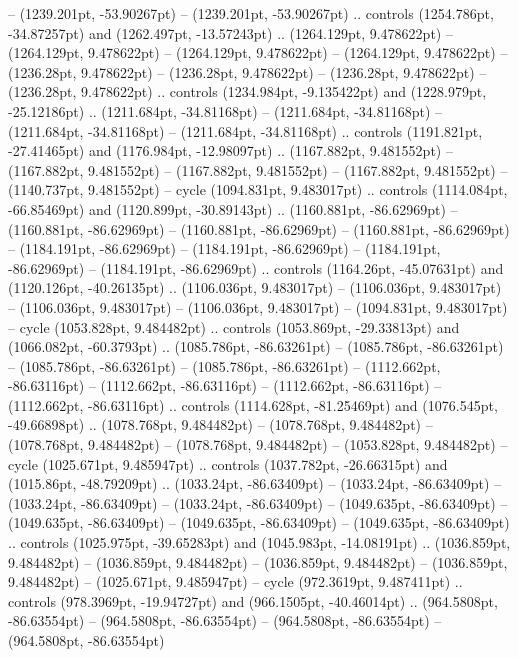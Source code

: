  -- (1239.201pt, -53.90267pt)
 -- (1239.201pt, -53.90267pt) .. controls (1254.786pt, -34.87257pt) and (1262.497pt, -13.57243pt) .. (1264.129pt, 9.478622pt)
 -- (1264.129pt, 9.478622pt)
 -- (1264.129pt, 9.478622pt)
 -- (1264.129pt, 9.478622pt)
 -- (1236.28pt, 9.478622pt)
 -- (1236.28pt, 9.478622pt)
 -- (1236.28pt, 9.478622pt)
 -- (1236.28pt, 9.478622pt) .. controls (1234.984pt, -9.135422pt) and (1228.979pt, -25.12186pt) .. (1211.684pt, -34.81168pt)
 -- (1211.684pt, -34.81168pt)
 -- (1211.684pt, -34.81168pt)
 -- (1211.684pt, -34.81168pt) .. controls (1191.821pt, -27.41465pt) and (1176.984pt, -12.98097pt) .. (1167.882pt, 9.481552pt)
 -- (1167.882pt, 9.481552pt)
 -- (1167.882pt, 9.481552pt)
 -- (1167.882pt, 9.481552pt)
 -- (1140.737pt, 9.481552pt) -- cycle
(1094.831pt, 9.483017pt) .. controls (1114.084pt, -66.85469pt) and (1120.899pt, -30.89143pt) .. (1160.881pt, -86.62969pt)
 -- (1160.881pt, -86.62969pt)
 -- (1160.881pt, -86.62969pt)
 -- (1160.881pt, -86.62969pt)
 -- (1184.191pt, -86.62969pt)
 -- (1184.191pt, -86.62969pt)
 -- (1184.191pt, -86.62969pt)
 -- (1184.191pt, -86.62969pt) .. controls (1164.26pt, -45.07631pt) and (1120.126pt, -40.26135pt) .. (1106.036pt, 9.483017pt)
 -- (1106.036pt, 9.483017pt)
 -- (1106.036pt, 9.483017pt)
 -- (1106.036pt, 9.483017pt)
 -- (1094.831pt, 9.483017pt) -- cycle
(1053.828pt, 9.484482pt) .. controls (1053.869pt, -29.33813pt) and (1066.082pt, -60.3793pt) .. (1085.786pt, -86.63261pt)
 -- (1085.786pt, -86.63261pt)
 -- (1085.786pt, -86.63261pt)
 -- (1085.786pt, -86.63261pt)
 -- (1112.662pt, -86.63116pt)
 -- (1112.662pt, -86.63116pt)
 -- (1112.662pt, -86.63116pt)
 -- (1112.662pt, -86.63116pt) .. controls (1114.628pt, -81.25469pt) and (1076.545pt, -49.66898pt) .. (1078.768pt, 9.484482pt)
 -- (1078.768pt, 9.484482pt)
 -- (1078.768pt, 9.484482pt)
 -- (1078.768pt, 9.484482pt)
 -- (1053.828pt, 9.484482pt) -- cycle
(1025.671pt, 9.485947pt) .. controls (1037.782pt, -26.66315pt) and (1015.86pt, -48.79209pt) .. (1033.24pt, -86.63409pt)
 -- (1033.24pt, -86.63409pt)
 -- (1033.24pt, -86.63409pt)
 -- (1033.24pt, -86.63409pt)
 -- (1049.635pt, -86.63409pt)
 -- (1049.635pt, -86.63409pt)
 -- (1049.635pt, -86.63409pt)
 -- (1049.635pt, -86.63409pt) .. controls (1025.975pt, -39.65283pt) and (1045.983pt, -14.08191pt) .. (1036.859pt, 9.484482pt)
 -- (1036.859pt, 9.484482pt)
 -- (1036.859pt, 9.484482pt)
 -- (1036.859pt, 9.484482pt)
 -- (1025.671pt, 9.485947pt) -- cycle
(972.3619pt, 9.487411pt) .. controls (978.3969pt, -19.94727pt) and (966.1505pt, -40.46014pt) .. (964.5808pt, -86.63554pt)
 -- (964.5808pt, -86.63554pt)
 -- (964.5808pt, -86.63554pt)
 -- (964.5808pt, -86.63554pt)
